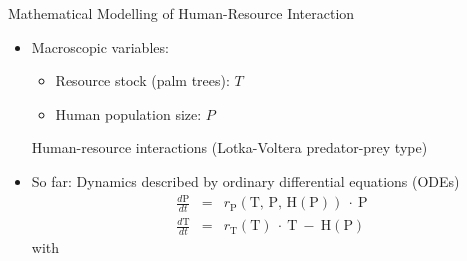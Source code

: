 
\begin{frame}{Mathematical Modelling of Human-Resource Interaction}

\begin{itemize}
	\item Macroscopic variables: 
	\begin{itemize}
		\item Resource stock (palm trees): $T$
		\item Human population size: $P$
	\end{itemize} 
	\ra Human-resource interactions (Lotka-Voltera predator-prey type)
	\item So far: Dynamics described by ordinary differential equations (ODEs)
	\begin{eqnarray*}\label{eq:ode}
		\frac{d \text{P}}{dt} & = & r_\text{P} (\text{T, P, H}(\text{P})) \ \cdot \ \text{P} \\
		\frac{d \text{T}}{dt} & = & r_\text{T} (\text{T}) \ \cdot \ \text{T} \ - \   \text{H}(\text{P}) 
	\end{eqnarray*}	
with 
\end{itemize}
\end{frame}

